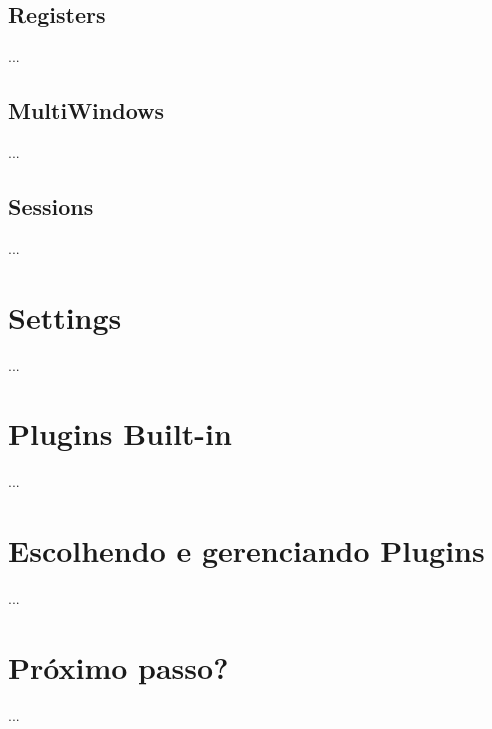 \documentclass[a4paper, 12pt]{article}
\begin{document}
\subsection{Registers}
...
\newpage

\subsection{MultiWindows}
...
\newpage

\subsection{Sessions}
...
\newpage

\section{Settings}
...
\newpage

\section{Plugins Built-in}
...
\newpage

\section{Escolhendo e gerenciando Plugins}
...
\newpage

\section{Próximo passo?}
...
\newpage
\end{document}
